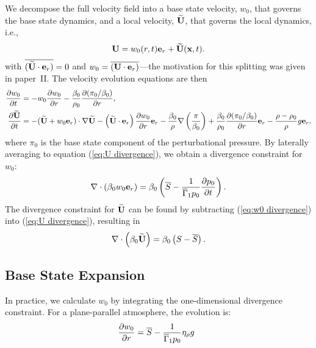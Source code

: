 We decompose the full velocity field into a base state velocity,
$w_0$, that governs the base state dynamics, and a local velocity,
$\widetilde{{\bf U}}$, that governs the local dynamics, i.e., 
\begin{equation}
{\bf U} = w_0(r,t){\bf e}_r + \widetilde{{\bf U}}({\bf x},t).
\end{equation}
with
$\overline{(\widetilde{{\bf U}}\cdot{\bf e}_r)} = 0$ and
$w_0 = \overline{({\bf U}\cdot{\bf e}_r)}$---the motivation for this splitting was given in paper~II.
The velocity evolution equations are then 
\begin{align}
\frac{\partial w_0}{\partial t} &= -w_0\frac{\partial w_0}{\partial
  r} - \frac{\beta_0}{\rho_0}\frac{\partial(\pi_0/\beta_0)}{\partial r},\label{eq:w0
  evolution}\\ 
%
\frac{\partial\Ubt}{\partial t} &= -(\Ubt + w_0\er)\cdot\nabla\Ubt
  - \left(\Ubt\cdot\eb_r\right)\frac{\partial w_0}{\partial r}\eb_r -
\frac{\beta_0}{\rho}\nabla\left(\frac{\pi}{\beta_0} \right) +
\frac{\beta_0}{\rho_0}\frac{\partial(\pi_0/\beta_0)}{\partial r}\eb_r -
\frac{\rho-\rho_0}{\rho}g\eb_r.\label{eq:flow:utildeupd}
\end{align}
where $\pi_0$ is the base state component of the perturbational pressure.
By laterally averaging to equation (\ref{eq:U divergence}),
we obtain a divergence constraint for $w_0$:
\begin{equation}
\nabla\cdot(\beta_0 w_0 {\bf e}_r) = 
    \beta_0\left(\overline{S} - \frac{1}{\overline{\Gamma}_1 p_0}
           \frac{\partial p_0}{\partial t}\right).\label{eq:w0 divergence}
\end{equation}
The divergence constraint for $\widetilde{{\bf U}}$ can be found by subtracting
(\ref{eq:w0 divergence}) into (\ref{eq:U divergence}), resulting in
\begin{equation}
\nabla\cdot\left(\beta_0\widetilde{{\bf U}}\right) = \beta_0\left(S-\overline{S}\right).\label{eq:utilde divergence}
\end{equation}



\subsection{Base State Expansion}


In practice, we calculate $w_0$ by integrating
the one-dimensional divergence constraint.  For a plane-parallel atmosphere, the
evolution is:
\begin{equation}
\label{eq:flow:dw0dr_planar}
\frac{\partial w_0}{\partial r} = \overline{S} - \frac{1}{\overline{\Gamma}_1 p_0} \eta_{\rho} g \enskip 
\end{equation}

